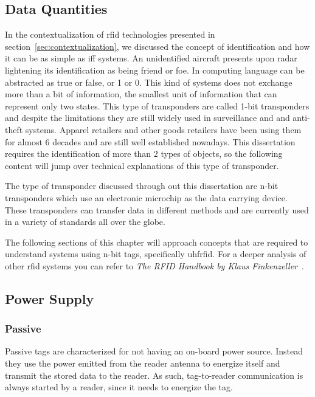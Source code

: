 \subsection{Data Quantities}

In the contextualization of \ac{rfid} technologies presented in section~\ref{sec:contextualization}, we discussed the concept of identification and how it can be as simple as \ac{iff} systems. 
An unidentified aircraft presents upon radar lightening its identification as being friend or foe. In computing language can be abstracted as true or false, or 1 or 0. This kind of systems does not exchange more than a bit of information, the smallest unit of information that can represent only two states.
This type of transponders are called 1-bit transponders and despite the limitations they are still widely used in surveillance and and anti-theft systems. Apparel retailers and other goods retailers have been using them for almost 6 decades and are still well established nowadays. 
This dissertation requires the identification of more than 2 types of objects, so the following content will jump over technical explanations of this type of transponder. 

The type of transponder discussed through out this dissertation are n-bit transponders which use an electronic microchip as the data carrying device.
These transponders can transfer data in different methods and are currently used in a variety of standards all over the globe.

The following sections of this chapter will approach concepts that are required to understand systems using n-bit tags, specifically \ac{uhfrfid}.
For a deeper analysis of other \ac{rfid} systems you can refer to \emph{The RFID Handbook by Klaus Finkenzeller}~\cite{finkenzellerRFIDHandbookFundamentals2003}.

\subsection{Power Supply}

\subsubsection{Passive}

Passive tags are characterized for not having an on-board power source. 
Instead they use the power emitted from the reader antenna to energize itself and transmit the stored data to the reader.
As such, tag-to-reader communication is always started by a reader, since it needs to energize the tag.

